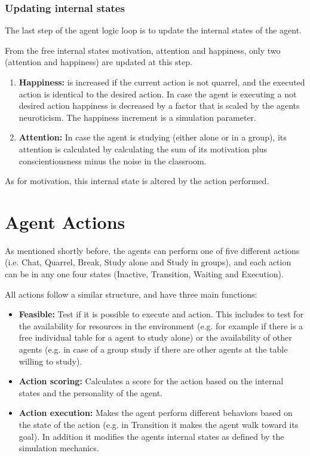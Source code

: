 \subsubsection{Updating internal states}
The last step of the agent logic loop is to update the internal states of the agent.

From the free internal states motivation, attention and happiness, only two (attention
and happiness) are updated at this step.

\begin{enumerate}
    \item \textbf{Happiness:} is increased if the current action is not quarrel,
    and the executed action is identical to the desired action. In case the agent
    is executing a not desired action happiness is decreased by a factor that is
    scaled by the agents neuroticism. The happiness increment is a simulation parameter.
    \item \textbf{Attention:} In case the agent is studying (either alone or in a group),
    its attention is calculated by calculating the sum of its motivation plus conscientiousness
    minus the noise in the classroom.
\end{enumerate}

As for motivation, this internal state is altered by the action performed.

\section{Agent Actions}
As mentioned shortly before, the agents can perform one of five different actions (i.e.
Chat, Quarrel, Break, Study alone and Study in groups),
and each action can be in any one four states (Inactive, Transition, Waiting and Execution).

All actions follow a similar structure, and have three main functions:

\begin{itemize}
    \item \textbf{Feasible:} Test if it is possible to execute and action. This
    includes to test for the availability for resources in the environment
    (e.g. for example if there is a free individual table for a agent to study alone)
    or the availability of other agents (e.g. in case of a group study if there are
    other agents at the table willing to study).
    \item \textbf{Action scoring:} Calculates a score for the action based on the
    internal states and the personality of the agent.
    \item \textbf{Action execution:} Makes the agent perform different behaviors
    based on the state of the action (e.g. in Transition it makes the agent walk toward its goal).
    In addition it modifies the agents internal states as defined by the simulation
    mechanics.
\end{itemize}

